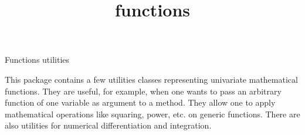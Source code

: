 \documentclass[12pt]{article}
\begin{document}
\begin{titlepage}
\title{functions}{Functions utilities}

\vfill
This package contains a few utilities classes representing univariate
mathematical functions. They are useful, for example, when one wants to pass
an arbitrary function of one variable as argument to a method.
They allow one to apply mathematical operations like squaring, power, etc.
on generic functions. There are also utilities for numerical
differentiation and integration.
\vfill
\end{titlepage}


\tableofcontents


















%
\end{document}
